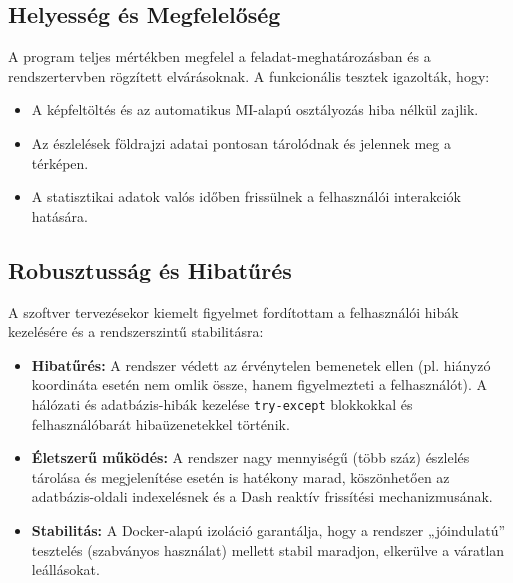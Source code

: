\documentclass[
	parspace, %
]{elteikthesis}[2024/04/26]
\begin{document}
\subsection{Helyesség és Megfelelőség}
A program teljes mértékben megfelel a feladat-meghatározásban és a rendszertervben rögzített elvárásoknak. A funkcionális tesztek igazolták, hogy:
\begin{itemize}
    \item A képfeltöltés és az automatikus MI-alapú osztályozás hiba nélkül zajlik.
    \item Az észlelések földrajzi adatai pontosan tárolódnak és jelennek meg a térképen.
    \item A statisztikai adatok valós időben frissülnek a felhasználói interakciók hatására.
\end{itemize}

\subsection{Robusztusság és Hibatűrés}
A szoftver tervezésekor kiemelt figyelmet fordítottam a felhasználói hibák kezelésére és a rendszerszintű stabilitásra:
\begin{itemize}
    \item \textbf{Hibatűrés:} A rendszer védett az érvénytelen bemenetek ellen (pl. hiányzó koordináta esetén nem omlik össze, hanem figyelmezteti a felhasználót). A hálózati és adatbázis-hibák kezelése \texttt{try-except} blokkokkal és felhasználóbarát hibaüzenetekkel történik.
    \item \textbf{Életszerű működés:} A rendszer nagy mennyiségű (több száz) észlelés tárolása és megjelenítése esetén is hatékony marad, köszönhetően az adatbázis-oldali indexelésnek és a Dash reaktív frissítési mechanizmusának.
    \item \textbf{Stabilitás:} A Docker-alapú izoláció garantálja, hogy a rendszer „jóindulatú” tesztelés (szabványos használat) mellett stabil maradjon, elkerülve a váratlan leállásokat.
\end{itemize}
\end{document}
